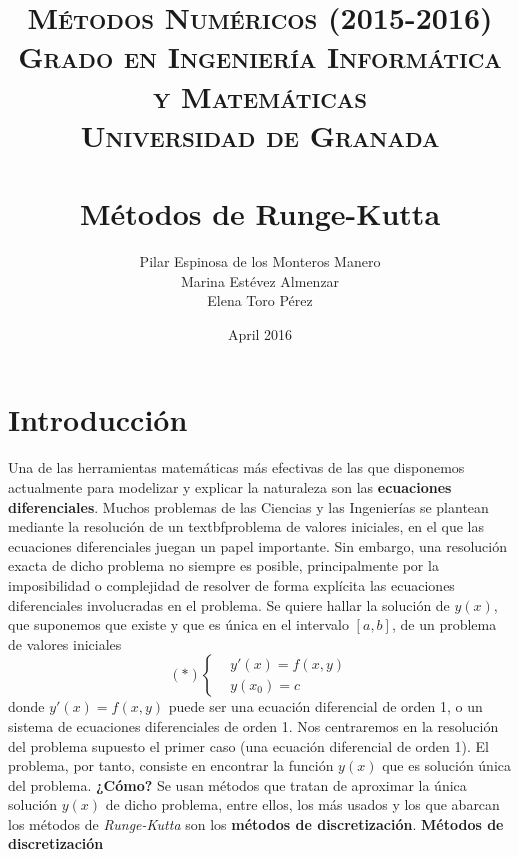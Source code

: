 \documentclass[paper=a4, fontsize=11pt]{scrartcl} %
\title{	
\normalfont \normalsize 
\textsc{{\bf Métodos Numéricos (2015-2016)} \\ Grado en Ingeniería Informática y Matemáticas \\ Universidad de Granada} \\ [25pt] %
\horrule{0.5pt} \\[0.4cm] %
\huge Métodos de Runge-Kutta %
\horrule{1pt} \\[0.5cm] %
}
\author{Pilar Espinosa de los Monteros Manero \\ Marina Estévez Almenzar \\ Elena Toro Pérez }
\date{April 2016}
\numberwithin{equation}{section}
\begin{document}
\maketitle

\newpage %

\tableofcontents %
\pagebreak

	\section{Introducción}
	 Una de las herramientas matemáticas más efectivas de las que disponemos actualmente para modelizar y explicar la naturaleza son las \textbf{ecuaciones diferenciales}. Muchos problemas de las Ciencias y las Ingenierías se plantean mediante la resolución de un textbf{problema de valores iniciales}, en el que las ecuaciones diferenciales juegan un papel importante. Sin embargo, una resolución exacta de dicho problema no siempre es posible, principalmente por la imposibilidad o complejidad de resolver de forma explícita las ecuaciones diferenciales involucradas en el problema.
	\newline
	Se quiere hallar la solución de $y(x)$, que suponemos que existe y que es única en el intervalo $[a,b]$, de un problema de valores iniciales
	\newline
	\begin{equation*}
		(*)  \begin{cases} 
		&\text{$y'(x) = f(x,y)$}
		\\
		&\text{$y(x_0) = c$} 
		\end{cases} 
	\end{equation*}
	donde $y'(x) = f(x,y)$ puede ser una ecuación diferencial de orden 1, o un sistema de ecuaciones diferenciales de orden 1. Nos centraremos en la resolución del problema supuesto el primer caso (una ecuación diferencial de orden 1).
	El problema, por tanto, consiste en encontrar la función $y(x)$ que es solución única del problema.
	\newline\newline
	\textbf{¿Cómo?}
	\newline
	 Se usan métodos que tratan de aproximar la única solución $y(x)$ de dicho problema, entre ellos, los más usados y los que abarcan los métodos de \textit{Runge-Kutta} son los \textbf{métodos de discretización}.
	 \newline\newline
	 \textbf{Métodos de discretización}
	 \newline
\end{document}
